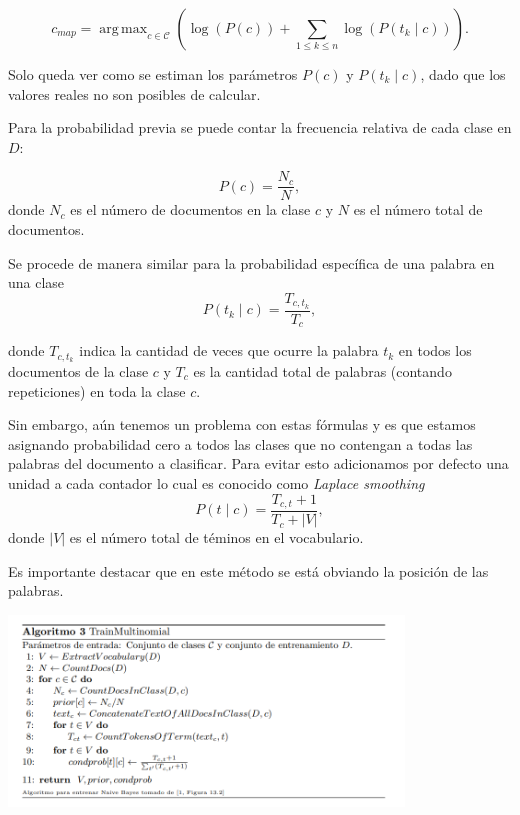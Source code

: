 \documentclass[t,compress,10pt,xcolor=dvipsnames]{beamer}
\DeclareMathOperator*{\argmax}{arg\,max}
\begin{document}
{		
		\[
		c_{map} = \argmax_{c\in\mathcal{C}} \left( \log(P(c))  + \sum_{1\leq k\leq n} \log(P(t_k\mid c)) \right).
		\]
		
		\framebreak
		
		
		Solo queda ver como se estiman los par\'ametros $P(c)$ y $P (t_k\mid c)$, dado que los valores reales no son posibles de calcular.
		
		
			Para la probabilidad previa se puede contar la frecuencia relativa de cada clase en $D$:
		
		\[P(c) = \frac{ N_c }{N} , \]
		donde $N_c$ es el n\'umero de documentos en la clase $c$ y $N$ es el n\'umero total de documentos.
		
		\framebreak
		
		 Se procede de manera similar para la probabilidad espec\'ifica de una palabra en una clase
		\[
		P(t_k\mid c) =\frac{ T_{c,t_k}}{T_{c}},
		\]
		
		
		
		donde $T_{c,t_k}$ indica la cantidad de veces que ocurre  la palabra $t_k$ en todos los documentos de la clase $c$ y $T_{c}$ es la cantidad total de palabras (contando repeticiones) en toda la clase $c$. 
		
		\framebreak
		
		Sin embargo, a\'un tenemos un problema con estas f\'ormulas y es que estamos asignando probabilidad cero a todos las clases que no contengan a todas las palabras del documento a clasificar. Para evitar esto adicionamos por defecto una unidad a cada contador lo cual es conocido como \emph{Laplace smoothing}
		\[
		P(t\mid c) = \frac{T_{c,t} + 1}{T_c + |V|},	
		\]
		donde $|V|$ es el n\'umero total de t\'eminos en el vocabulario.
		
		Es importante destacar que en este m\'etodo se est\'a obviando la posici\'on de las palabras.
		
		
		\framebreak
		
		
		\includegraphics[width=10.5cm]{TrainMultinomial.png}
		
}
\end{document}
